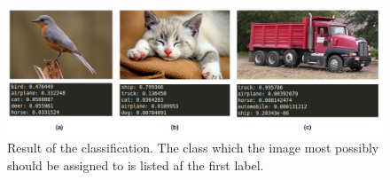 \begin{figure}[H]
  \centering
  \includegraphics[width=\columnwidth]{Img/classification-images-with-labels.pdf}
  \caption{Result of the classification. The class which the image most possibly should be assigned to is listed af the first label.}
  \label{fig:images-result}
\end{figure}


